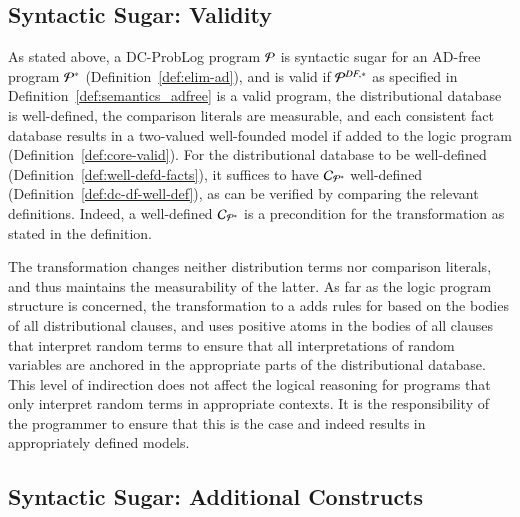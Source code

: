 \subsection{Syntactic Sugar: Validity}
\label{sec:dcvalidity}

As stated above, a DC-ProbLog program ${\mathcal{P}}$  is syntactic sugar for an AD-free program ${{\mathcal{P}}^{*}}$ (Definition~\ref{def:elim-ad}),
and is valid if ${{\mathcal{P}}^{DF,*}}$ as specified in Definition~\ref{def:semantics_adfree} is a valid \dfplpsty program, \ie the distributional database is well-defined,
the comparison literals are measurable,
and each consistent fact database results in a two-valued  well-founded  model if added to the logic program (Definition~\ref{def:core-valid}).
For the distributional database to be well-defined (Definition~\ref{def:well-defd-facts}), it suffices to have $\mathcal{C}_{{\mathcal{P}}^{*}}$ well-defined  (Definition~\ref{def:dc-df-well-def}), as can be verified by comparing the relevant definitions. Indeed, a well-defined $\mathcal{C}_{{\mathcal{P}}^{*}}$ is a precondition for the transformation as stated in the definition.

The transformation changes neither distribution terms nor comparison literals, and thus maintains the measurability of the latter.
As far as the logic program structure is concerned, the transformation to a \dfplpsty adds rules for  based on the bodies of all distributional clauses, and uses positive  atoms in the bodies of all clauses  that interpret random terms to ensure that all interpretations of random variables are anchored in the appropriate parts of the distributional database. This level of indirection does not affect the logical reasoning for programs that only interpret random terms in appropriate contexts. It is the responsibility of the programmer to ensure that this is the case and indeed results in appropriately defined models.











\subsection{Syntactic Sugar: Additional Constructs}
\label{sec:Additionalsyntacticsugar}

